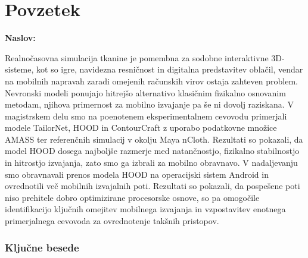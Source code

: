 \chapter*{Povzetek}

\noindent\textbf{Naslov:} \ttitle
\bigskip

Realnočasovna simulacija tkanine je pomembna za sodobne interaktivne 3D-sisteme, kot so igre, navidezna resničnost in digitalna predstavitev oblačil, vendar na mobilnih napravah zaradi omejenih računskih virov ostaja zahteven problem. Nevronski modeli ponujajo hitrejšo alternativo klasičnim fizikalno osnovanim metodam, njihova primernost za mobilno izvajanje pa še ni dovolj raziskana. V magistrskem delu smo na poenotenem eksperimentalnem cevovodu primerjali modele TailorNet, HOOD in ContourCraft z uporabo podatkovne množice AMASS ter referenčnih simulacij v okolju Maya nCloth. Rezultati so pokazali, da model HOOD dosega najboljše razmerje med natančnostjo, fizikalno stabilnostjo in hitrostjo izvajanja, zato smo ga izbrali za mobilno obravnavo. V nadaljevanju smo obravnavali prenos modela HOOD na operacijski sistem Android in ovrednotili več mobilnih izvajalnih poti. Rezultati so pokazali, da pospešene poti niso prehitele dobro optimizirane procesorske osnove, so pa omogočile identifikacijo ključnih omejitev mobilnega izvajanja in vzpostavitev enotnega primerjalnega cevovoda za ovrednotenje takšnih pristopov.

\subsection*{Ključne besede}
\textit{\tkeywords}
\clearemptydoublepage